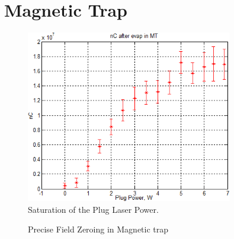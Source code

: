 \section{Magnetic Trap}\label{exp:mt}
\begin{figure}
  \begin{center}
    \includegraphics[width=9cm]{plug-power.png}
  \end{center}
  \caption{Saturation of the Plug Laser Power.}
  \label{exp:plug-power}
\end{figure}
\begin{figure}
  \begin{center}
  \end{center}
  \caption{Precise Field Zeroing in Magnetic trap}
  \label{exp:field-zeroing}
\end{figure}
